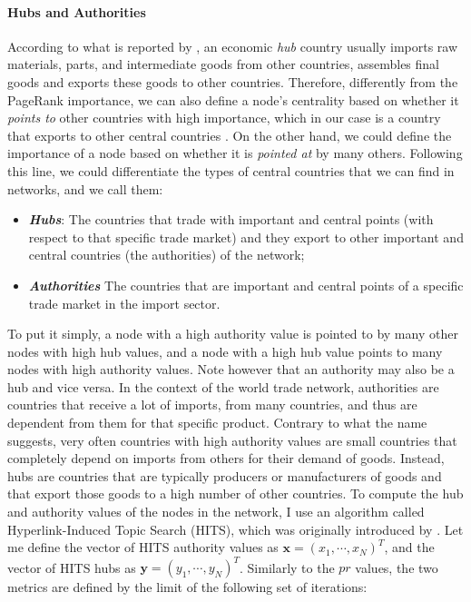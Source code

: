 \paragraph{Hubs and Authorities}
According to what is reported by \textcite{deguchi2014hubs}, an economic \textit{hub} country usually imports raw materials, parts, and intermediate goods from other countries, assembles final goods and exports these goods to other countries. %
Therefore, differently from the PageRank importance, we can also define a node's centrality based on whether it \textit{points to} other countries with high importance, which in our case is a country that exports to other central countries \cite{sajedianfard2021quantitative}. On the other hand, we could define the importance of a node based on whether it is \textit{pointed at} by many others. Following this line, we could differentiate the types of central countries that we can find in networks, and we call them:
\begin{itemize}
    \item \textbf{\textit{Hubs}}: The countries that trade with important and central points (with respect to that specific trade market) and they export to other important and central countries (the authorities) of the network;
    \item \textbf{\textit{Authorities}} The countries that are important and central points of a specific trade market in the import sector.
\end{itemize}
To put it simply, a node with a high authority value is pointed to by many other nodes with high hub values, and a node with a high hub value points to many nodes with high authority values. Note however that an authority may also be a hub and vice versa. In the context of the world trade network, authorities are countries that receive a lot of imports, from many countries, and thus are dependent from them for that specific product. Contrary to what the name suggests, very often countries with high authority values are small countries that completely depend on imports from others for their demand of goods. Instead, hubs are countries that are typically producers or manufacturers of goods and that export those goods to a high number of other countries.
To compute the hub and authority values of the nodes in the network, I use an algorithm called Hyperlink-Induced Topic Search (HITS), which was originally introduced by \textcite{kleinberg1999authoritative}. Let me define the vector of HITS authority values as $\mathbf{x}=(x_1,\cdots,x_N)^T$, and the vector of HITS hubs as $\mathbf{y}=(y_1,\cdots,y_N)^T$. Similarly to the $pr$ values, the two metrics are defined by the limit of the following set of iterations:
